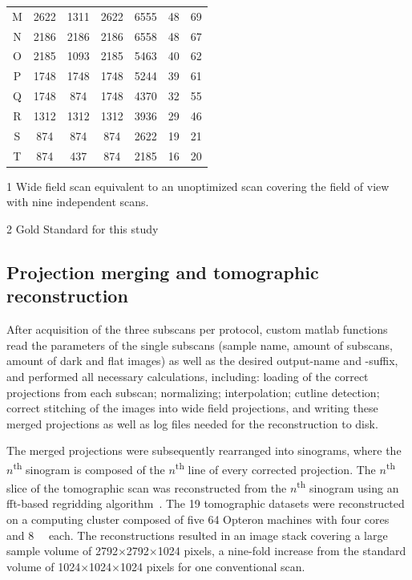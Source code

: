 {\begin{threeparttable}
\begin{tabular}{ccccccc}
		M & 2622 & 1311 & 2622 & 6555  &  48 & 69\\
		N & 2186 & 2186 & 2186 & 6558  &  48 & 67\\
		O & 2185 & 1093 & 2185 & 5463  &  40 & 62\\
		P & 1748 & 1748 & 1748 & 5244  &  39 & 61\\
		Q & 1748 & 874  & 1748 & 4370  &  32 & 55\\
		R & 1312 & 1312 & 1312 & 3936  &  29 & 46\\
		S & 874  & 874  & 874  & 2622  &  19 & 21\\
		\rowcolor{lightgray} T & 874  & 437  & 874  & 2185  &  16  & 20\\
		\bottomrule
	\end{tabular}
	\begin{tablenotes}
		\footnotesize
		\item[1] Wide field scan equivalent to an unoptimized scan covering the field of view with nine independent scans.
		\item[2] Gold Standard for this study
	\end{tablenotes}
\end{threeparttable}
}

\subsection{Projection merging and tomographic reconstruction}
After acquisition of the three subscans per protocol, custom \ac{matlab} functions read the parameters of the single subscans (\eg sample name, amount of subscans, amount of dark and flat images) as well as the desired output-name and -suffix, and performed all necessary calculations, including: loading of the correct projections from each subscan; normalizing; interpolation; cutline detection; correct stitching of the images into wide field projections, and writing these merged projections as well as log files needed for the reconstruction to disk.

The merged projections were subsequently rearranged into sinograms, where the $n$\textsuperscript{th} sinogram is composed of the $n$\textsuperscript{th} line of every corrected projection. The $n$\textsuperscript{th} slice of the tomographic scan was reconstructed from the $n$\textsuperscript{th} sinogram using an \acs{fft}-based regridding algorithm~\cite{Dowd1999,Marone2008}. The 19 tomographic datasets were reconstructed on a computing cluster composed of five \SI{64}{\bit} Opteron machines with four cores and \SI{8}{\giga\byte}  each. The reconstructions resulted in an image stack covering a large sample volume of 2792$\times$2792$\times$1024 pixels, a nine-fold increase from the standard volume of 1024$\times$1024$\times$1024 pixels for one conventional scan.

